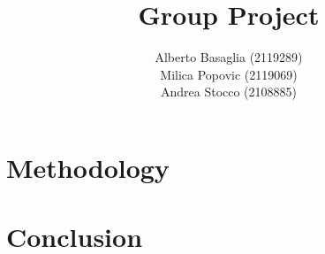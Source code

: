 \documentclass{template}
\title{Group Project}
\author{
Alberto Basaglia (2119289)\\
Milica Popovic (2119069)\\
Andrea Stocco (2108885)}
\begin{document}


\chapter{Methodology}
\chapter{Conclusion}

\cite{test}

\appendix
\end{document}

